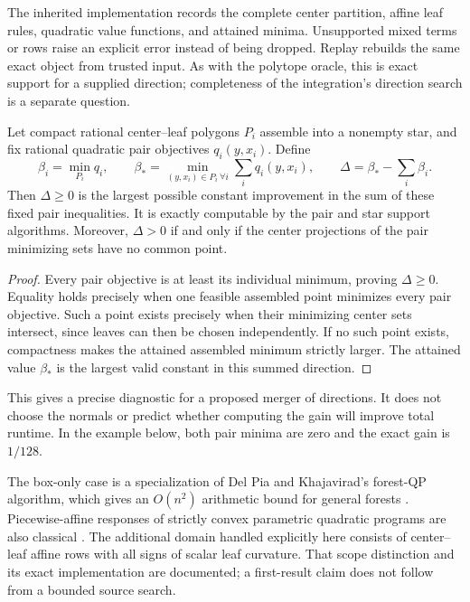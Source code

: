 The inherited implementation
records the complete center partition, affine leaf rules, quadratic
value functions, and attained minima. Unsupported mixed terms or rows
raise an explicit error instead of being dropped. Replay rebuilds the
same exact object from trusted input. As with the polytope oracle, this
is exact support for a supplied direction; completeness of the
integration's direction search is a separate question.

\begin{corollary}\label{cor:gain}
Let compact rational center--leaf polygons $P_i$ assemble into a nonempty
star, and fix rational quadratic pair objectives $q_i(y,x_i)$. Define
\[
\beta_i=\min_{P_i}q_i,\qquad
\beta_* = \min_{(y,x_i)\in P_i\ \forall i}\sum_iq_i(y,x_i),
\qquad \Delta=\beta_*-\sum_i\beta_i.
\]
Then $\Delta\ge0$ is the largest possible constant improvement in
the sum of these fixed pair inequalities. It is exactly computable by
the pair and star support algorithms. Moreover, $\Delta>0$ if and
only if the center projections of the pair minimizing sets have no
common point.
\end{corollary}
\begin{proof}
Every pair objective is at least its individual minimum, proving
$\Delta\ge0$. Equality holds precisely when one feasible assembled
point minimizes every pair objective. Such a point exists precisely
when their minimizing center sets intersect, since leaves can then
be chosen independently. If no such point exists, compactness makes
the attained assembled minimum strictly larger. The attained value
$\beta_*$ is the largest valid constant in this summed direction.
\end{proof}

This gives a precise diagnostic for a proposed merger of directions.
It does not choose the normals or predict whether computing the gain
will improve total runtime. In the example below, both pair minima
are zero and the exact gain is $1/128$.

The box-only case is a specialization of Del Pia and Khajavirad's
forest-QP algorithm, which gives an $O(n^2)$ arithmetic bound for general
forests \cite{DelPiaKhajavirad2026}. Piecewise-affine responses of
strictly convex parametric quadratic programs are also classical
\cite{BemporadEtAl2002}. The additional domain handled explicitly here
consists of center--leaf affine rows with all signs of scalar leaf
curvature. That scope distinction and its exact implementation are
documented; a first-result claim does not follow from a bounded source
search.
